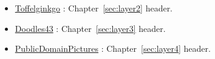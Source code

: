 \begin{itemize}
\item \href{https://commons.wikimedia.org/wiki/File:Winter_2004_DreamHack_LAN_Party.jpg}{Toffelginkgo} : Chapter~\ref{sec:layer2} header.
\item \href{https://pixabay.com/photos/golden-gate-bridge-san-francisco-1549662/}{Doodles43} : Chapter~\ref{sec:layer3} header.
\item \href{https://pixabay.com/photos/green-plastic-pipes-culvert-water-72772/}{PublicDomainPictures} : Chapter~\ref{sec:layer4} header.
\end{itemize}
